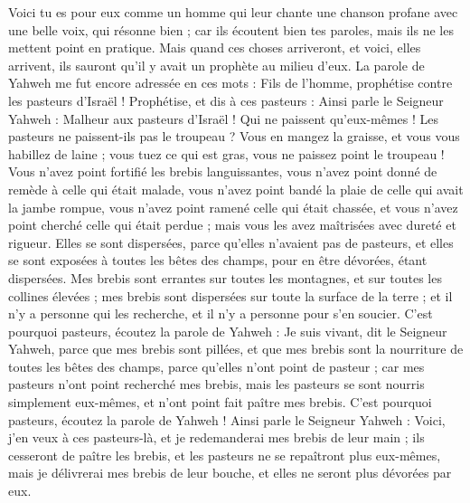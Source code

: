 \begin{multicols}{2}
Voici tu es pour eux comme un homme qui leur chante une chanson profane avec une belle voix, qui résonne bien ; car ils écoutent bien tes paroles, mais ils ne les mettent point en pratique.
Mais quand ces choses arriveront, et voici, elles arrivent,  ils sauront qu'il y avait un prophète au milieu d'eux.
\VerseOne{}La parole de Yahweh me fut encore adressée en ces mots :
Fils de l’homme, prophétise contre les pasteurs d'Israël ! Prophétise, et dis à ces pasteurs : Ainsi parle le Seigneur Yahweh : Malheur aux pasteurs d'Israël ! Qui ne paissent qu'eux-mêmes ! Les pasteurs ne paissent-ils pas le troupeau ?
Vous en mangez la graisse, et vous vous habillez de laine ; vous tuez ce qui est gras, vous ne paissez point le troupeau !
Vous n'avez point fortifié les brebis languissantes, vous n'avez point donné de remède à celle qui était malade, vous n'avez point bandé la plaie de celle qui avait la jambe rompue, vous n'avez point ramené celle qui était chassée, et vous n'avez point cherché celle qui était perdue ; mais vous les avez maîtrisées avec dureté et rigueur.
Elles se sont dispersées, parce qu’elles n’avaient pas de pasteurs, et elles se sont exposées à toutes les bêtes des champs, pour en être dévorées, étant dispersées.
Mes brebis sont errantes sur toutes les montagnes, et sur toutes les collines élevées ; mes brebis sont dispersées sur toute la surface de la terre ; et il n'y a personne qui les recherche, et il n'y a personne pour s'en soucier.
C'est pourquoi pasteurs, écoutez la parole de Yahweh :
Je suis vivant, dit le Seigneur Yahweh, parce que mes brebis sont pillées, et que mes brebis sont la nourriture de toutes les bêtes des champs, parce qu'elles n’ont point de pasteur ; car mes pasteurs n'ont point recherché mes brebis, mais les pasteurs se sont nourris simplement eux-mêmes, et n'ont point fait paître mes brebis.
C'est pourquoi pasteurs, écoutez la parole de Yahweh !
Ainsi parle le Seigneur Yahweh : Voici, j'en veux à ces pasteurs-là, et je redemanderai mes brebis de leur main ; ils cesseront de paître les brebis, et les pasteurs ne se repaîtront plus eux-mêmes, mais je délivrerai mes brebis de leur bouche, et elles ne seront plus dévorées par eux.

\end{multicols}
